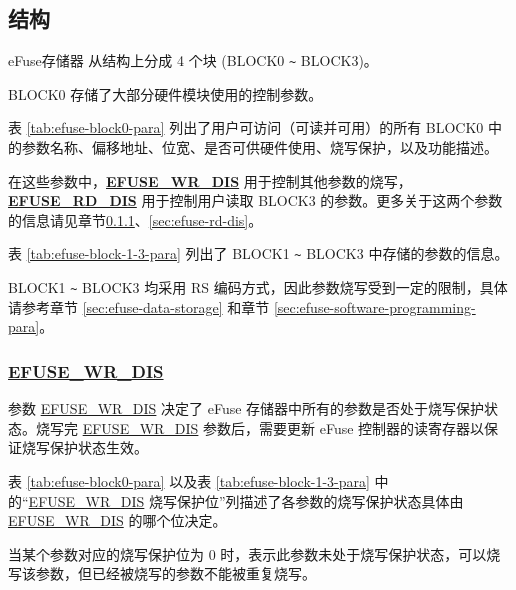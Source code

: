 \documentclass[main\_\_CN.tex]{subfiles}
\begin{document}
\subsection{结构}

eFuse存储器 从结构上分成 4 个块 (BLOCK0 \verb+~+ BLOCK3)。

BLOCK0 存储了大部分硬件模块使用的控制参数。

表 \ref{tab:efuse-block0-para} 列出了用户可访问（可读并可用）的所有 BLOCK0 中的参数名称、偏移地址、位宽、是否可供硬件使用、烧写保护，以及功能描述。

在这些参数中，{\bfseries \hyperref[fielddesc:EFUSEWRDIS]{EFUSE\_WR\_DIS}} 用于控制其他参数的烧写，{\bfseries \hyperref[fielddesc:EFUSERDDIS]{EFUSE\_RD\_DIS}} 用于控制用户读取 BLOCK3 的参数。更多关于这两个参数的信息请见章节\ref{sec:efuse-wr-dis}、\ref{sec:efuse-rd-dis}。

\clearpage
\begin{landscape}



\end{landscape}
\restoregeometry
\clearpage

表 \ref{tab:efuse-block-1-3-para} 列出了 BLOCK1 \verb+~+ BLOCK3 中存储的参数的信息。





BLOCK1 \verb+~+ BLOCK3 均采用 RS 编码方式，因此参数烧写受到一定的限制，具体请参考章节 \ref{sec:efuse-data-storage} 和章节 \ref{sec:efuse-software-programming-para}。

\subsubsection{\hyperref[fielddesc:EFUSEWRDIS]{EFUSE\_WR\_DIS}}
\label{sec:efuse-wr-dis}

参数 \hyperref[fielddesc:EFUSEWRDIS]{EFUSE\_WR\_DIS} 决定了 eFuse 存储器中所有的参数是否处于烧写保护状态。烧写完 \hyperref[fielddesc:EFUSEWRDIS]{EFUSE\_WR\_DIS} 参数后，需要更新 eFuse 控制器的读寄存器以保证烧写保护状态生效。

表 \ref{tab:efuse-block0-para} 以及表 \ref{tab:efuse-block-1-3-para} 中的“\hyperref[fielddesc:EFUSEWRDIS]{EFUSE\_WR\_DIS} 烧写保护位”列描述了各参数的烧写保护状态具体由 \hyperref[fielddesc:EFUSEWRDIS]{EFUSE\_WR\_DIS} 的哪个位决定。

当某个参数对应的烧写保护位为 0 时，表示此参数未处于烧写保护状态，可以烧写该参数，但已经被烧写的参数不能被重复烧写。
\end{document}
